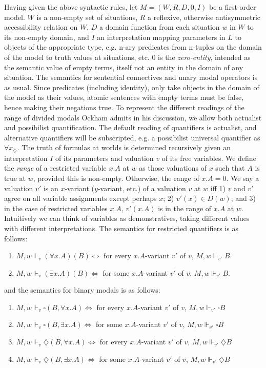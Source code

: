 \documentclass[]{article}
\begin{document}
Having given the above syntactic rules, let $M = (W, R, D, 0, I)$ be a first-order model. $W$ is a non-empty set of situations, $R$ a reflexive, otherwise antisymmetric accessibility relation on $W$, $D$ a domain function from each situation $w$ in $W$ to its non-empty domain, and $I$ an interpretation mapping parameters in $L$ to objects of the appropriate type, e.g. n-ary predicates from n-tuples on the domain of the model to truth values at situations, etc. $0$ is the \textit{zero-entity}, intended as the semantic value of empty terms, itself not an entity in the domain of any situation. The semantics for sentential connectives and unary modal operators is as usual. Since predicates (including identity), only take objects in the domain of the model as their values, atomic sentences with empty terms must be false, hence making their negations true. To represent the different readings of the range of divided modals Ockham admits in his discussion, we allow both actualist and possibilist quantification. The default reading of quantifiers is actualist, and alternative quantifiers will be subscripted, e.g. a possibilist universal quantifier as $\forall x_{\diamondsuit}$. The truth of formulas at worlds is determined recursively given an interpretation $I$ of its parameters and valuation $v$ of its free variables. We define the \textit{range} of a restricted variable $x.A$ at $w$ as those valuations of $x$ such that $A$ is true at $w$, provided this is non-empty. Otherwise, the range of $x.A = 0$. We say a valuation $v'$ is an $x$-variant ($y$-variant, etc.) of a valuation $v$ at $w$ iff 1) $v$ and $v'$ agree on all variable assignments except perhaps $x$; 2) $v'(x) \in D(w)$; and 3) in the case of restricted variables $x.A$, $v'(x.A)$ is in the range of $x.A$ at $w$. Intuitively we can think of variables as demonstratives, taking different values with different interpretations. The semantics for restricted quantifiers is as follows: 
\begin{enumerate}
	\item $M, w \Vdash_{v} (\forall x.A)(B) \Leftrightarrow$ for every $x.A$-variant $v'$ of $v$, $M, w \Vdash_{v'} B$.
	\item $M, w \Vdash_{v} (\exists x.A)(B) \Leftrightarrow$ for some $x.A$-variant $v'$ of $v$, $M, w \Vdash_{v'} B$.
\end{enumerate}
and the semantics for binary modals is as follows: 
\begin{enumerate}
	\item $M, w \Vdash_{v} \square(B, \forall x.A) \Leftrightarrow$ for every $x.A$-variant $v'$ of $v$, $M, w \Vdash_{v'} \square B$
	\item $M, w \Vdash_{v} \square(B, \exists x.A) \Leftrightarrow$ for some $x.A$-variant $v'$ of $v$, $M, w \Vdash _{v'} \square B$
	\item $M, w \Vdash_{v} \diamondsuit(B, \forall x.A) \Leftrightarrow$ for every $x.A$-variant $v'$ of $v$, $M, w \Vdash_{v'} \diamondsuit B$
	\item $M, w \Vdash_{v} \diamondsuit(B, \exists x.A) \Leftrightarrow$ for some $x.A$-variant $v'$ of $v$, $M, w \Vdash _{v'} \diamondsuit B$
\end{enumerate}
\end{document}

